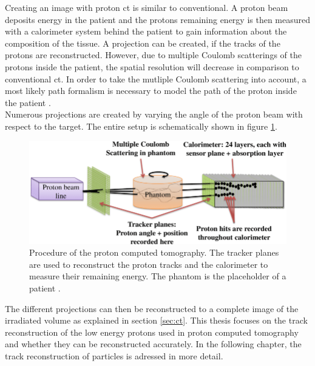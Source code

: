 Creating an image with proton ct is similar to conventional. A proton beam deposits energy in the patient and the
protons remaining energy is then measured with a calorimeter system behind the patient to gain information about the composition of the tissue. A projection can be created,
if the tracks of the protons are reconstructed. However, due to multiple Coulomb scatterings of the protons inside the patient, the spatial resolution will decrease in comparison
to conventional ct. In order to take the mutliple Coulomb scattering into account, a most likely path formalism is necessary to model the path of the proton inside the patient \cite{mlp}. \\
Numerous projections are created by varying the angle of the proton beam with respect to the target. The entire setup is schematically shown in figure \ref{fig:proton_ct}.

\begin{figure}
  \centering
  \includegraphics[height=0.4\textwidth]{images/proton_ct.png}
  \caption{Procedure of the proton computed tomography. The tracker planes are used to reconstruct the proton tracks and the calorimeter to measure their remaining energy.
  The phantom is the placeholder of a patient \cite{proton_ct}.}
  \label{fig:proton_ct}
\end{figure}

The different projections can then be reconstructed to a complete image of the irradiated volume as explained in section \ref{sec:ct}.
This thesis focuses on the track reconstruction of the low energy protons used in proton computed tomography and whether they can be reconstructed accurately.
In the following chapter, the track reconstruction of particles is adressed in more detail.
